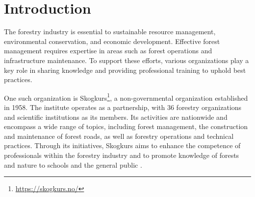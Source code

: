 \chapter{Introduction}\label{chap:introduction}

The forestry industry is essential to sustainable resource management, environmental conservation, and economic development. Effective forest management requires expertise in areas such as forest operations and infrastructure maintenance. To support these efforts, various organizations play a key role in sharing knowledge and providing professional training to uphold best practices.

One such organization is Skogkurs\footnote{\url{https://skogkurs.no/}}, a non-governmental organization established in 1958. The institute operates as a partnership, with 36 forestry organizations and scientific institutions as its members. Its activities are nationwide and encompass a wide range of topics, including forest management, the construction and maintenance of forest roads, as well as forestry operations and technical practices\cite{skogkurs_eng}. Through its initiatives, Skogkurs aims to enhance the competence of professionals within the forestry industry and to promote knowledge of forests and nature to schools and the general public \cite{skogkurs_nor}. 

